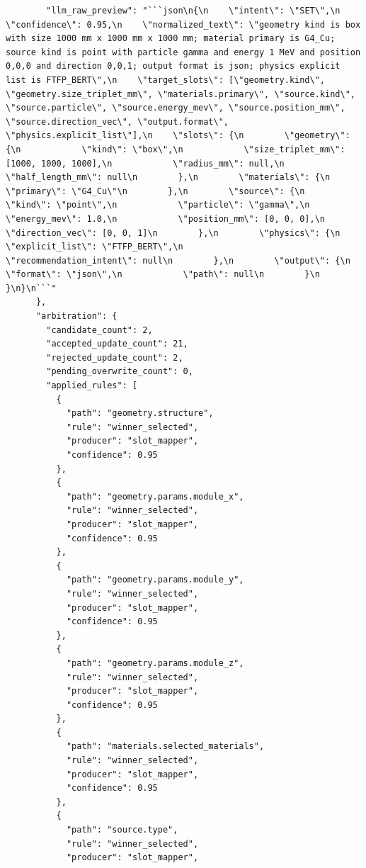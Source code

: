 \documentclass[11pt]{article}
\begin{document}
\begin{lstlisting}
        "llm_raw_preview": "```json\n{\n    \"intent\": \"SET\",\n    \"confidence\": 0.95,\n    \"normalized_text\": \"geometry kind is box with size 1000 mm x 1000 mm x 1000 mm; material primary is G4_Cu; source kind is point with particle gamma and energy 1 MeV and position 0,0,0 and direction 0,0,1; output format is json; physics explicit list is FTFP_BERT\",\n    \"target_slots\": [\"geometry.kind\", \"geometry.size_triplet_mm\", \"materials.primary\", \"source.kind\", \"source.particle\", \"source.energy_mev\", \"source.position_mm\", \"source.direction_vec\", \"output.format\", \"physics.explicit_list\"],\n    \"slots\": {\n        \"geometry\": {\n            \"kind\": \"box\",\n            \"size_triplet_mm\": [1000, 1000, 1000],\n            \"radius_mm\": null,\n            \"half_length_mm\": null\n        },\n        \"materials\": {\n            \"primary\": \"G4_Cu\"\n        },\n        \"source\": {\n            \"kind\": \"point\",\n            \"particle\": \"gamma\",\n            \"energy_mev\": 1.0,\n            \"position_mm\": [0, 0, 0],\n            \"direction_vec\": [0, 0, 1]\n        },\n        \"physics\": {\n            \"explicit_list\": \"FTFP_BERT\",\n            \"recommendation_intent\": null\n        },\n        \"output\": {\n            \"format\": \"json\",\n            \"path\": null\n        }\n    }\n}\n```"
      },
      "arbitration": {
        "candidate_count": 2,
        "accepted_update_count": 21,
        "rejected_update_count": 2,
        "pending_overwrite_count": 0,
        "applied_rules": [
          {
            "path": "geometry.structure",
            "rule": "winner_selected",
            "producer": "slot_mapper",
            "confidence": 0.95
          },
          {
            "path": "geometry.params.module_x",
            "rule": "winner_selected",
            "producer": "slot_mapper",
            "confidence": 0.95
          },
          {
            "path": "geometry.params.module_y",
            "rule": "winner_selected",
            "producer": "slot_mapper",
            "confidence": 0.95
          },
          {
            "path": "geometry.params.module_z",
            "rule": "winner_selected",
            "producer": "slot_mapper",
            "confidence": 0.95
          },
          {
            "path": "materials.selected_materials",
            "rule": "winner_selected",
            "producer": "slot_mapper",
            "confidence": 0.95
          },
          {
            "path": "source.type",
            "rule": "winner_selected",
            "producer": "slot_mapper",

\end{lstlisting}
\end{document}
